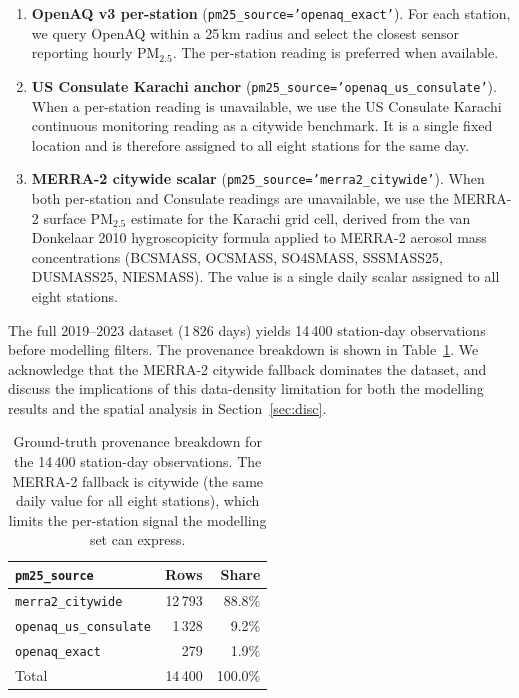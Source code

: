 \documentclass{iopjournal}
\begin{document}
\begin{enumerate}
  \item \textbf{OpenAQ v3 per-station} (\texttt{pm25\_source='openaq\_exact'}).
        For each station, we query OpenAQ within a 25\,km radius and
        select the closest sensor reporting hourly PM$_{2.5}$. The
        per-station reading is preferred when available.
  \item \textbf{US Consulate Karachi anchor}
        (\texttt{pm25\_source='openaq\_us\_consulate'}). When a
        per-station reading is unavailable, we use the US Consulate
        Karachi continuous monitoring reading as a citywide benchmark.
        It is a single fixed location and is therefore assigned to all
        eight stations for the same day.
  \item \textbf{MERRA-2 citywide scalar}
        (\texttt{pm25\_source='merra2\_citywide'}). When both
        per-station and Consulate readings are unavailable, we use
        the MERRA-2 surface PM$_{2.5}$ estimate for the Karachi grid
        cell, derived from the van Donkelaar 2010 hygroscopicity
        formula applied to MERRA-2 aerosol mass concentrations
        (BCSMASS, OCSMASS, SO4SMASS, SSSMASS25, DUSMASS25, NIESMASS).
        The value is a single daily scalar assigned to all eight
        stations.
\end{enumerate}

The full 2019--2023 dataset (1\,826 days) yields
14\,400 station-day observations before modelling filters. The
provenance breakdown is shown in
Table~\ref{tab:provenance}. We acknowledge that the
MERRA-2 citywide fallback dominates the dataset, and discuss the
implications of this data-density limitation for both the modelling
results and the spatial analysis in
Section~\ref{sec:disc}.

\begin{table}
\caption{Ground-truth provenance breakdown for the 14\,400
station-day observations. The MERRA-2 fallback is citywide (the same
daily value for all eight stations), which limits the per-station
signal the modelling set can express.}
\centering
\begin{tabular}{l r r}
\hline
\texttt{pm25\_source}        & Rows  & Share \\
\hline
\texttt{merra2\_citywide}        & 12\,793 & 88.8\% \\
\texttt{openaq\_us\_consulate}   & 1\,328  & 9.2\%  \\
\texttt{openaq\_exact}           & 279     & 1.9\%  \\
\hline
Total                       & 14\,400 & 100.0\% \\
\hline
\end{tabular}
\label{tab:provenance}
\end{table}
\end{document}
